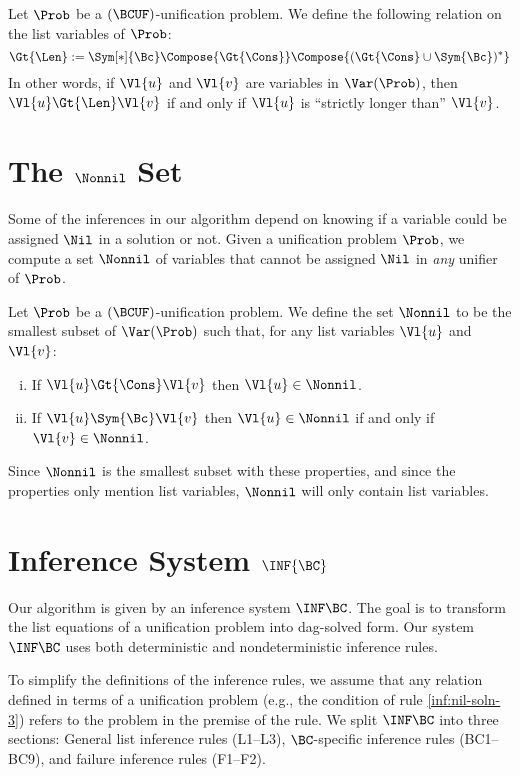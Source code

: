 \begin{Definition}
    Let $\Prob$ be a $(\BCUF)$-unification problem. We define the following
    relation on the list variables of $\Prob$:
    \[ {\Gt{\Len}} := {\Sym[*]{\Bc}} \Compose {\Gt{\Cons}} \Compose
       {({\Gt{\Cons}} \cup {\Sym{\Bc}})^*} \]
    In other words, if $\Vl{u}$ and $\Vl{v}$ are variables in $\Var(\Prob)$,
    then $\Vl{u} \Gt{\Len} \Vl{v}$ if and only if $\Vl{u}$ is ``strictly longer
    than'' $\Vl{v}$.
\end{Definition}

\section{The $\Nonnil$ Set}

Some of the inferences in our algorithm depend on knowing if a variable could
be assigned $\Nil$ in a solution or not. Given a unification problem $\Prob$,
we compute a set $\Nonnil$ of variables that cannot be assigned $\Nil$ in
\emph{any} unifier of $\Prob$.

\begin{Definition}
    Let $\Prob$ be a $(\BCUF)$-unification problem. We define the set $\Nonnil$
    to be the smallest subset of $\Var(\Prob)$ such that, for any list variables
    $\Vl{u}$ and $\Vl{v}$:
    \begin{enumerate}[(i)]
        \item If $\Vl{u} \Gt{\Cons} \Vl{v}$ then $\Vl{u} \in \Nonnil$.
        \item If $\Vl{u} \Sym{\Bc} \Vl{v}$ then $\Vl{u} \in \Nonnil$ if and only
            if $\Vl{v} \in \Nonnil$.
    \end{enumerate}

    Since $\Nonnil$ is the smallest subset with these properties, and since the
    properties only mention list variables, $\Nonnil$ will only contain list
    variables.
\end{Definition}

\section{Inference System $\INF{\BC}$}\label{sec:inf-bc}

Our algorithm is given by an inference system $\INF\BC$. The goal is to
transform the list equations of a unification problem into dag-solved form.
Our system $\INF\BC$ uses both deterministic and nondeterministic inference
rules.

To simplify the definitions of the inference rules, we assume that any relation
defined in terms of a unification problem (e.g., the condition of rule
\ref{inf:nil-soln-3}) refers to the problem in the premise of the rule. We
split $\INF\BC$ into three sections: General list inference rules (L1--L3),
$\BC$-specific inference rules (BC1--BC9), and failure inference rules
(F1--F2).

